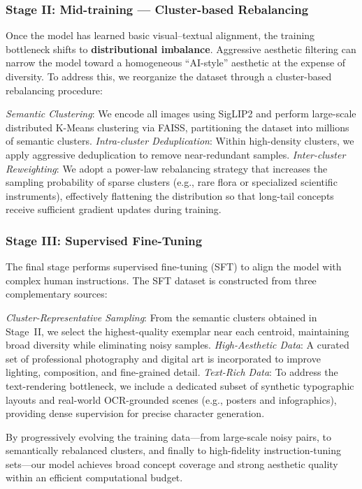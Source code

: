 \documentclass{article}
\begin{document}
\subsubsection{Stage II: Mid-training — Cluster-based Rebalancing}
Once the model has learned basic visual–textual alignment, the training bottleneck shifts to \textbf{distributional imbalance}. Aggressive aesthetic filtering can narrow the model toward a homogeneous ``AI-style'' aesthetic at the expense of diversity. To address this, we reorganize the dataset through a cluster-based rebalancing procedure:

\textit{Semantic Clustering}: We encode all images using SigLIP2 and perform large-scale distributed K-Means clustering via FAISS, partitioning the dataset into millions of semantic clusters. \textit{Intra-cluster Deduplication}: Within high-density clusters, we apply aggressive deduplication to remove near-redundant samples.
\textit{Inter-cluster Reweighting}: We adopt a power-law rebalancing strategy that increases the sampling probability of sparse clusters (e.g., rare flora or specialized scientific instruments), effectively flattening the distribution so that long-tail concepts receive sufficient gradient updates during training.


\subsubsection{Stage III: Supervised Fine-Tuning}
The final stage performs supervised fine-tuning (SFT) to align the model with complex human instructions. The SFT dataset is constructed from three complementary sources:

\textit{Cluster-Representative Sampling}: From the semantic clusters obtained in Stage~II, we select the highest-quality exemplar near each centroid, maintaining broad diversity while eliminating noisy samples. \textit{High-Aesthetic Data}: A curated set of professional photography and digital art is incorporated to improve lighting, composition, and fine-grained detail. \textit{Text-Rich Data}: To address the text-rendering bottleneck, we include a dedicated subset of synthetic typographic layouts and real-world OCR-grounded scenes (e.g., posters and infographics), providing dense supervision for precise character generation.

By progressively evolving the training data—from large-scale noisy pairs, to semantically rebalanced clusters, and finally to high-fidelity instruction-tuning sets—our model achieves broad concept coverage and strong aesthetic quality within an efficient computational budget.
\end{document}
